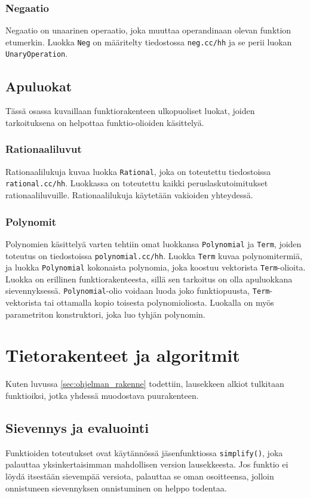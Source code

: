 \documentclass[10pt,a4paper]{article}
\begin{document}
\subsubsection{Negaatio}
Negaatio on unaarinen operaatio, joka muuttaa operandinaan olevan funktion etumerkin. Luokka \lstinline!Neg! on määritelty tiedostossa \texttt{neg.cc/hh} ja se perii luokan \lstinline!UnaryOperation!.

\subsection{Apuluokat}
Tässä osassa kuvaillaan funktiorakenteen ulkopuoliset luokat, joiden tarkoituksena on helpottaa funktio-olioiden käsittelyä.

\subsubsection{Rationaaliluvut}
Rationaalilukuja kuvaa luokka \lstinline{Rational}, joka on toteutettu tiedostoissa \texttt{rational.cc/hh}.
Luokkassa on toteutettu kaikki peruslaskutoimitukset rationaaliluvuille. Rationaalilukuja käytetään vakioiden yhteydessä.

\subsubsection{Polynomit}
Polynomien käsittelyä varten tehtiin omat luokkansa \lstinline!Polynomial! ja \lstinline!Term!, joiden toteutus on tiedostoissa \texttt{polynomial.cc/hh}. Luokka \lstinline!Term! kuvaa polynomitermiä, ja luokka \lstinline!Polynomial! kokonaista polynomia, joka koostuu vektorista \lstinline!Term!-olioita. Luokka on erillinen funktiorakenteesta, sillä sen tarkoitus on olla apuluokkana sievennyksessä. \lstinline!Polynomial!-olio voidaan luoda joko funktiopuusta, \lstinline!Term!-vektorista tai ottamalla kopio toisesta polynomioliosta. Luokalla on myös parametriton konstruktori, joka luo tyhjän polynomin.



\section{Tietorakenteet ja algoritmit}	\label{sec:trak}
Kuten luvussa \ref{sec:ohjelman_rakenne} todettiin, lausekkeen alkiot tulkitaan funktioiksi,
jotka yhdessä muodostava puurakenteen.

\subsection{Sievennys ja evaluointi}
Funktioiden toteutukset ovat käytännössä jäsenfunktiossa \lstinline!simplify()!, joka palauttaa
yksinkertaisimman mahdollisen version lausekkeesta. Jos funktio ei löydä itsestään sievempää versiota, palauttaa se oman osoitteensa, jolloin onnistuneen sievennyksen onnistuminen on helppo todentaa.
\end{document}
